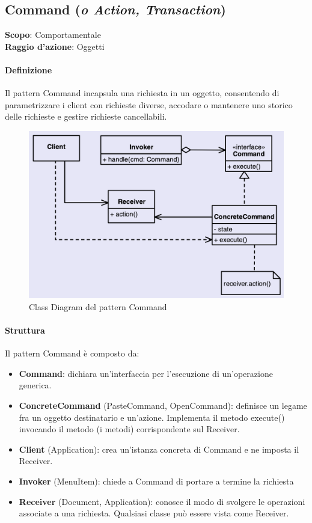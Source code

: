 \subsection{Command (\textit{o Action, Transaction})}
\label{command}

\textbf{Scopo}: Comportamentale \\
\textbf{Raggio d'azione}: Oggetti

\paragraph{Definizione} Il pattern Command incapsula una richiesta in un oggetto, consentendo di parametrizzare i client con richieste diverse, accodare o mantenere uno storico delle richieste e gestire richieste cancellabili.

\begin{figure}[H]
    \centering
    \includegraphics[width=1\linewidth]{assets/pattern/command/command-struttura.png}
    \caption{Class Diagram del pattern Command}
\end{figure}

\paragraph{Struttura} Il pattern Command è composto da:
\begin{itemize}
    \item \textbf{Command}: dichiara un’interfaccia per l’esecuzione di un’operazione generica. 
    \item \textbf{ConcreteCommand} (PasteCommand, OpenCommand): definisce un legame fra un oggetto destinatario e un’azione. Implementa il metodo execute() invocando il metodo (i metodi) corrispondente sul Receiver. 
    \item \textbf{Client} (Application): crea un’istanza concreta di Command e ne imposta il Receiver. 
    \item \textbf{Invoker} (MenuItem): chiede a Command di portare a termine la richiesta 
    \item \textbf{Receiver} (Document, Application): conosce il modo di svolgere le operazioni associate a una richiesta. Qualsiasi classe può essere vista come Receiver.
\end{itemize}

